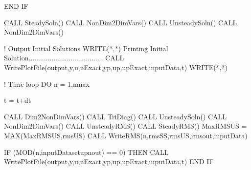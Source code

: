 \documentclass[letterpaper,10pt,english]{sphinxmanual}
\begin{document}
\begin{sphinxVerbatim}[commandchars=\\\{\}]
      END IF

      CALL SteadySoln()
      CALL NonDim2DimVars()
      CALL UnsteadySoln()
      CALL NonDim2DimVars()

      ! Output Initial Solutions
      WRITE(*,*) \PYGZsq{}Printing Initial Solution.......................................\PYGZsq{}
      CALL WritePlotFile(output,\PYGZsq{}\PYGZdq{}y\PYGZdq{},\PYGZdq{}u\PYGZdq{},\PYGZdq{}uExact\PYGZdq{},\PYGZdq{}yp\PYGZdq{},\PYGZdq{}up\PYGZdq{},\PYGZdq{}upExact\PYGZdq{}\PYGZsq{},inputData,t)
      WRITE(*,*)\PYGZsq{}\PYGZhy{}\PYGZhy{}\PYGZhy{}\PYGZhy{}\PYGZhy{}\PYGZhy{}\PYGZhy{}\PYGZhy{}\PYGZhy{}\PYGZhy{}\PYGZhy{}\PYGZhy{}\PYGZhy{}\PYGZhy{}\PYGZhy{}\PYGZhy{}\PYGZhy{}\PYGZhy{}\PYGZhy{}\PYGZhy{}\PYGZhy{}\PYGZhy{}\PYGZhy{}\PYGZhy{}\PYGZhy{}\PYGZhy{}\PYGZhy{}\PYGZhy{}\PYGZhy{}\PYGZhy{}\PYGZhy{}\PYGZhy{}\PYGZhy{}\PYGZhy{}\PYGZhy{}\PYGZhy{}\PYGZhy{}\PYGZhy{}\PYGZhy{}\PYGZhy{}\PYGZhy{}\PYGZhy{}\PYGZhy{}\PYGZhy{}\PYGZhy{}\PYGZhy{}\PYGZhy{}\PYGZhy{}\PYGZhy{}\PYGZhy{}\PYGZhy{}\PYGZhy{}\PYGZhy{}\PYGZhy{}\PYGZhy{}\PYGZhy{}\PYGZhy{}\PYGZhy{}\PYGZhy{}\PYGZhy{}\PYGZhy{}\PYGZhy{}\PYGZhy{}\PYGZhy{}\PYGZhy{}\PYGZsq{}

      ! Time loop
      DO n = 1,nmax

        t = t+dt

        CALL Dim2NonDimVars()
        CALL TriDiag()
        CALL UnsteadySoln()
        CALL NonDim2DimVars()
        CALL UnsteadyRMS()
        CALL SteadyRMS()
        MaxRMS\PYGZus{}US = MAX(MaxRMS\PYGZus{}US,rms\PYGZus{}US)
        CALL WriteRMS(n,rms\PYGZus{}SS,rms\PYGZus{}US,rmsout,inputData)

        IF (MOD(n,inputData\PYGZpc{}setup\PYGZpc{}nout) == 0) THEN
            CALL WritePlotFile(output,\PYGZsq{}\PYGZdq{}y\PYGZdq{},\PYGZdq{}u\PYGZdq{},\PYGZdq{}uExact\PYGZdq{},\PYGZdq{}yp\PYGZdq{},\PYGZdq{}up\PYGZdq{},\PYGZdq{}upExact\PYGZdq{}\PYGZsq{},inputData,t)
        END IF


\end{sphinxVerbatim}
\end{document}

